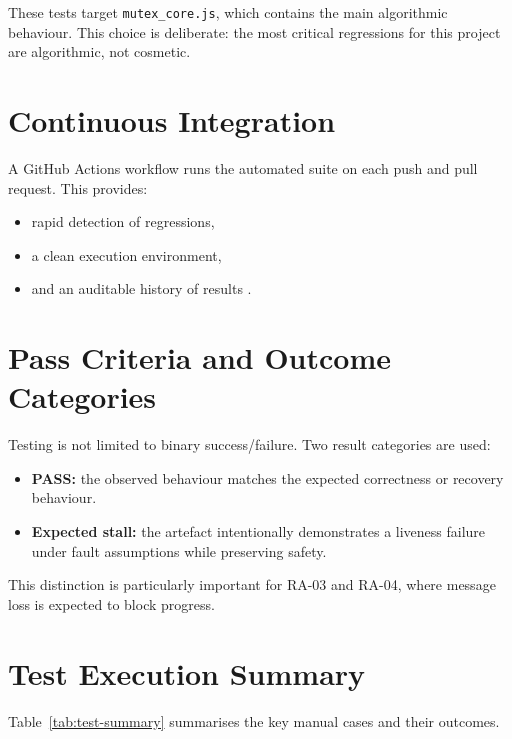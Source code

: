 These tests target \texttt{mutex\_core.js}, which contains the main algorithmic behaviour. This choice is deliberate: the most critical regressions for this project are algorithmic, not cosmetic.

\section{Continuous Integration}
A GitHub Actions workflow runs the automated suite on each push and pull request. This provides:
\begin{itemize}
  \item rapid detection of regressions,
  \item a clean execution environment,
  \item and an auditable history of results \cite{chacon2014progit}.
\end{itemize}

\section{Pass Criteria and Outcome Categories}
Testing is not limited to binary success/failure. Two result categories are used:

\begin{itemize}
  \item \textbf{PASS:} the observed behaviour matches the expected correctness or recovery behaviour.
  \item \textbf{Expected stall:} the artefact intentionally demonstrates a liveness failure under fault assumptions while preserving safety.
\end{itemize}

This distinction is particularly important for RA-03 and RA-04, where message loss is expected to block progress.

\section{Test Execution Summary}
Table~\ref{tab:test-summary} summarises the key manual cases and their outcomes.

